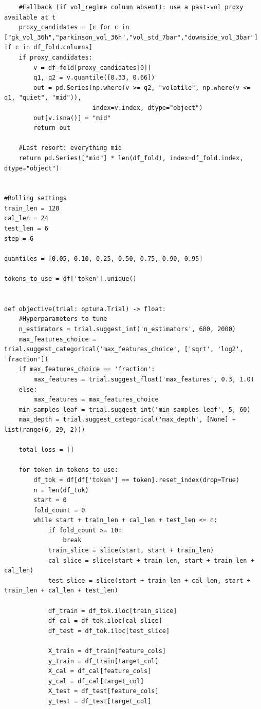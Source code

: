 \documentclass[
  a4paper,
  DIV=11,
  numbers=noendperiod]{scrreprt}
\begin{document}
\begin{verbatim}
    #Fallback (if vol_regime column absent): use a past-vol proxy available at t
    proxy_candidates = [c for c in ["gk_vol_36h","parkinson_vol_36h","vol_std_7bar","downside_vol_3bar"] if c in df_fold.columns]
    if proxy_candidates:
        v = df_fold[proxy_candidates[0]]
        q1, q2 = v.quantile([0.33, 0.66])
        out = pd.Series(np.where(v >= q2, "volatile", np.where(v <= q1, "quiet", "mid")),
                        index=v.index, dtype="object")
        out[v.isna()] = "mid"
        return out

    #Last resort: everything mid
    return pd.Series(["mid"] * len(df_fold), index=df_fold.index, dtype="object")


#Rolling settings
train_len = 120
cal_len = 24
test_len = 6
step = 6

quantiles = [0.05, 0.10, 0.25, 0.50, 0.75, 0.90, 0.95]

tokens_to_use = df['token'].unique()


def objective(trial: optuna.Trial) -> float:
    #Hyperparameters to tune
    n_estimators = trial.suggest_int('n_estimators', 600, 2000)
    max_features_choice = trial.suggest_categorical('max_features_choice', ['sqrt', 'log2', 'fraction'])
    if max_features_choice == 'fraction':
        max_features = trial.suggest_float('max_features', 0.3, 1.0)
    else:
        max_features = max_features_choice
    min_samples_leaf = trial.suggest_int('min_samples_leaf', 5, 60)
    max_depth = trial.suggest_categorical('max_depth', [None] + list(range(6, 29, 2)))

    total_loss = []

    for token in tokens_to_use:
        df_tok = df[df['token'] == token].reset_index(drop=True)
        n = len(df_tok)
        start = 0
        fold_count = 0
        while start + train_len + cal_len + test_len <= n:
            if fold_count >= 10:
                break
            train_slice = slice(start, start + train_len)
            cal_slice = slice(start + train_len, start + train_len + cal_len)
            test_slice = slice(start + train_len + cal_len, start + train_len + cal_len + test_len)

            df_train = df_tok.iloc[train_slice]
            df_cal = df_tok.iloc[cal_slice]
            df_test = df_tok.iloc[test_slice]

            X_train = df_train[feature_cols]
            y_train = df_train[target_col]
            X_cal = df_cal[feature_cols]
            y_cal = df_cal[target_col]
            X_test = df_test[feature_cols]
            y_test = df_test[target_col]


\end{verbatim}
\end{document}
